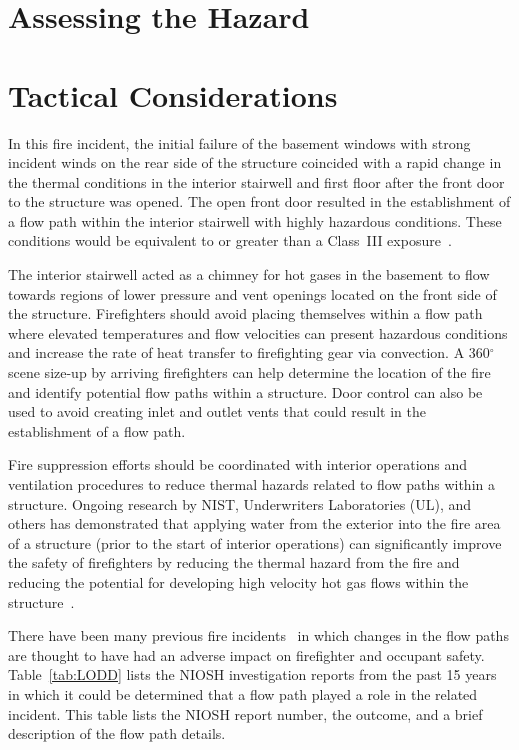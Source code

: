 \documentclass[12pt,oneside]{book}
\begin{document}
\clearpage

\section{Assessing the Hazard}
\label{assessing_hazard}

\clearpage

\section{Tactical Considerations}
\label{tactical_considerations}

In this fire incident, the initial failure of the basement windows with strong incident winds on the rear side of the structure coincided with a rapid change in the thermal conditions in the interior stairwell and first floor after the front door to the structure was opened. The open front door resulted in the establishment of a flow path within the interior stairwell with highly hazardous conditions. These conditions would be equivalent to or greater than a Class~III exposure~\cite{Donnelly2006}.

The interior stairwell acted as a chimney for hot gases in the basement to flow towards regions of lower pressure and vent openings located on the front side of the structure. Firefighters should avoid placing themselves within a flow path where elevated temperatures and flow velocities can present hazardous conditions and increase the rate of heat transfer to firefighting gear via convection. A 360$^\circ$ scene size-up by arriving firefighters can help determine the location of the fire and identify potential flow paths within a structure. Door control can also be used to avoid creating inlet and outlet vents that could result in the establishment of a flow path.

Fire suppression efforts should be coordinated with interior operations and ventilation procedures to reduce thermal hazards related to flow paths within a structure. Ongoing research by NIST, Underwriters Laboratories (UL), and others has demonstrated that applying water from the exterior into the fire area of a structure (prior to the start of interior operations) can significantly improve the safety of firefighters by reducing the thermal hazard from the fire and reducing the potential for developing high velocity hot gas flows within the structure~\cite{madrzykowski2009fire, kerber2009fire}.

There have been many previous fire incidents~\cite{NIOSH:Pettit,NIOSH:Washenitz,NIOSH:Mezzanotte,NIOSH:McFall,NIOSH:McFall2,NIOSH:McFall3,NIOSH:Berardinelli,NIOSH:Koedam,NIOSH:McFall4,NIOSH:Tarley,NIOSH:Braddee,NIOSH:Merinar,NIOSH:Bowyer2,NIOSH:Loflin,NIOSH:Bowyer} in which changes in the flow paths are thought to have had an adverse impact on firefighter and occupant safety. Table~\ref{tab:LODD} lists the NIOSH investigation reports from the past 15 years in which it could be determined that a flow path played a role in the related incident. This table lists the NIOSH report number, the outcome, and a brief description of the flow path details.
\end{document}
